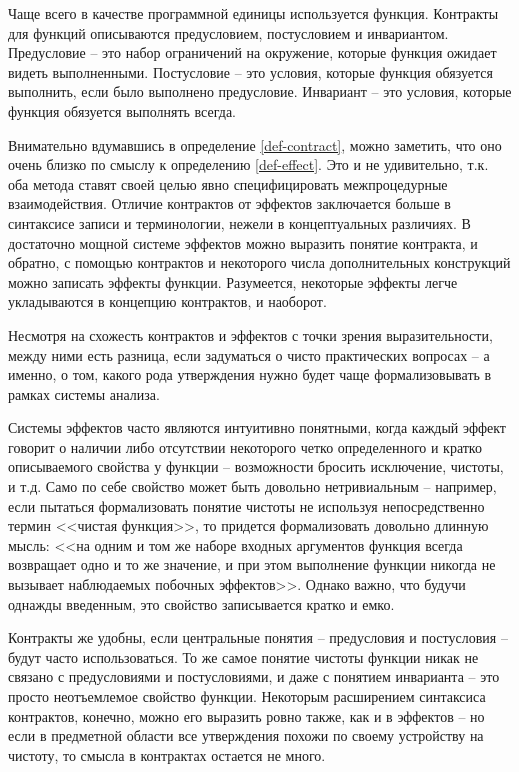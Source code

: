 Чаще всего в качестве программной единицы используется функция. Контракты для функций описываются предусловием, постусловием и инвариантом. Предусловие -- это набор ограничений на окружение, которые функция ожидает видеть выполненными. Постусловие -- это условия, которые функция обязуется выполнить, если было выполнено предусловие. Инвариант -- это условия, которые функция обязуется выполнять всегда.

Внимательно вдумавшись в определение \ref{def-contract}, можно заметить, что оно очень близко по смыслу к определению \ref{def-effect}. Это и не удивительно, т.к. оба метода ставят своей целью явно специфицировать межпроцедурные взаимодействия.  Отличие контрактов от эффектов заключается больше в синтаксисе записи и терминологии, нежели в концептуальных различиях. В достаточно мощной системе эффектов можно выразить понятие контракта, и обратно, с помощью контрактов и некоторого числа дополнительных конструкций можно записать эффекты функции. Разумеется, некоторые эффекты легче укладываются в концепцию контрактов, и наоборот. 

Несмотря на схожесть контрактов и эффектов с точки зрения выразительности, между ними есть разница, если задуматься о чисто практических вопросах -- а именно, о том, какого рода утверждения нужно будет чаще формализовывать в рамках системы анализа. 

Системы эффектов часто являются интуитивно понятными, когда каждый эффект говорит о наличии либо отсутствии некоторого четко определенного и кратко описываемого свойства у функции -- возможности бросить исключение, чистоты, и т.д. Само по себе свойство может быть довольно нетривиальным -- например, если пытаться формализовать понятие чистоты не используя непосредственно термин <<чистая функция>>, то придется формализовать довольно длинную мысль: <<на одним и том же наборе входных аргументов функция всегда возвращает одно и то же значение, и при этом выполнение функции никогда не вызывает наблюдаемых побочных эффектов>>. Однако важно, что будучи однажды введенным, это свойство записывается кратко и емко.

Контракты же удобны, если центральные понятия -- предусловия и постусловия -- будут часто использоваться. То же самое понятие чистоты функции никак не связано с предусловиями и постусловиями, и даже с понятием инварианта -- это просто неотъемлемое свойство функции. Некоторым расширением синтаксиса контрактов, конечно, можно его выразить ровно также, как и в эффектов -- но если в предметной области все утверждения похожи по своему устройству на чистоту, то смысла в контрактах остается не много.

